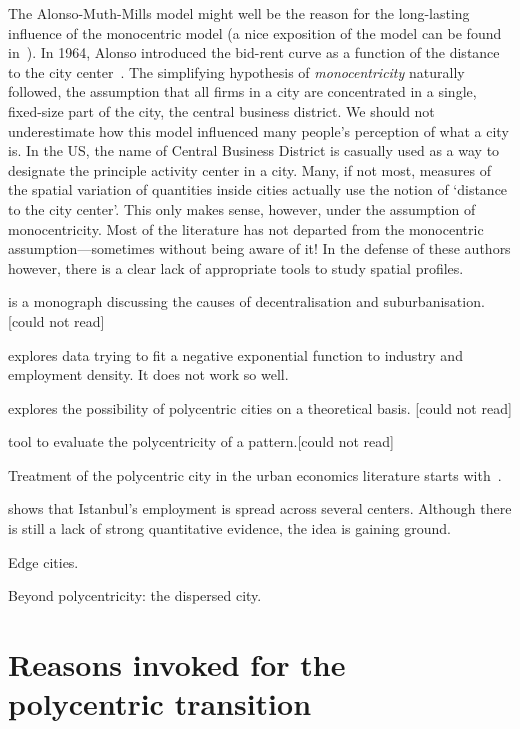 The Alonso-Muth-Mills model might well be the reason for the long-lasting influence of
the monocentric model (a nice exposition of the model can be found
in~\cite{Fujita:1989}). In 1964, Alonso introduced the bid-rent curve as a
function of the distance to the city center~\cite{Alonso:1964}. The simplifying hypothesis of
\emph{monocentricity} naturally followed, the assumption that all firms in a
city are concentrated in a single, fixed-size part of the city, the central business
district. We should not underestimate how this model influenced many people's
perception of what a city is. In the US, the name of Central Business District
is casually used as a way to designate the principle activity center in a city.
Many, if not most, measures of the spatial variation of quantities inside cities
actually use the notion of `distance to the city center'. This only makes sense,
however, under the assumption of monocentricity. Most of the
literature has not departed from the monocentric assumption---sometimes without
being aware of it! In the defense of these authors however, there is a clear
lack of appropriate tools to study spatial profiles.


\cite{Mills:1972} is a monograph discussing the causes of decentralisation and
suburbanisation. [could not read]

\cite{Kemper:1974} explores data trying to fit a negative exponential function
to industry and employment density. It does not work so well.

\cite{Odland:1978} explores the possibility of polycentric cities on a
theoretical basis. [could not read]

\cite{Griffith:1981} tool to evaluate the polycentricity of a pattern.[could not
read]

Treatment of the polycentric city in the urban economics literature starts
with~\cite{Fujita:1982}.

\cite{Dokmeci:1994} shows that Istanbul's employment is spread across several
centers. Although there is still a lack of strong quantitative evidence, the
idea is gaining ground.

\cite{Garreau:1991} Edge cities.

\cite{Gordon:1996} Beyond polycentricity: the dispersed city.

\section{Reasons invoked for the polycentric transition}
\label{sec:reasons_invoked_for_the_polycentric_transition}

